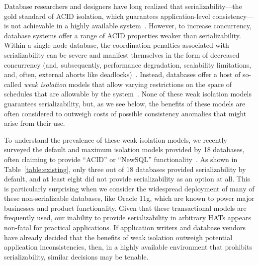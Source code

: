 Database researchers and designers have long realized that
serializability---the gold standard of ACID isolation, which
guarantees application-level consistency---is not achievable in a
highly available system~\cite{davidson-survey}.  However, to increase
concurrency, database systems offer a range of ACID properties weaker
than serializability. Within a single-node database, the coordination
penalties associated with serializability can be severe and manifest
themselves in the form of decreased concurrency (and, subsequently,
performance degradation, scalability limitations, and, often, external
aborts like deadlocks)~\cite{gray-isolation}. Instead, databases offer
a host of so-called \textit{weak isolation} models that allow varying
restrictions on the space of schedules that are allowable by the
system~\cite{adya}. None of these weak isolation models guarantees
serializability, but, as we see below, the benefits of these models
are often considered to outweigh costs of possible consistency
anomalies that might arise from their use.

To understand the prevalence of these weak isolation models, we
recently surveyed the default and maximum isolation models provided by
18 databases, often claiming to provide ``ACID'' or
``NewSQL'' functionality~\cite{hat-hotos}. As shown in
Table~\ref{table:existing}, only three out of 18 databases provided
serializability by default, and at least eight did not provide
serializability as an option at all. This is particularly surprising
when we consider the widespread deployment of many of these
non-serializable databases, like Oracle 11g, which are known to power
major businesses and product functionality. Given that these
transactional models are frequently used, our inability to provide
serializability in arbitrary HATs appears non-fatal for practical
applications. If application writers and database vendors have already
decided that the benefits of weak isolation outweigh potential
application inconsistencies, then, in a highly available environment
that prohibits serializability, similar decisions may be tenable.

